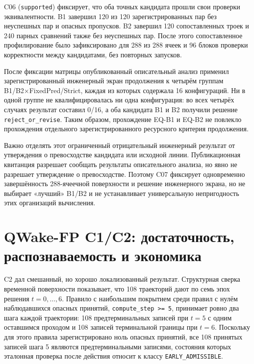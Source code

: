 C06 (\texttt{supported}) фиксирует, что оба точных кандидата прошли свои
проверки эквивалентности. B1 завершил 120 из 120 зарегистрированных пар без неуспешных пар и опасных пропусков. B2
завершил 120 сопоставленных троек и 240 парных сравнений также без неуспешных
пар. После этого сопоставленное профилирование было зафиксировано для 288 из
288 ячеек и 96 блоков проверки корректности между кандидатами, без повторных
запусков.

После фиксации матрицы опубликованный описательный анализ применил
зарегистрированный инженерный экран продолжения к четырём группам
B1/B2×FixedPred/Strict, каждая из которых содержала 16 конфигураций. Ни в одной
группе не квалифицировалась ни одна конфигурация: во всех четырёх случаях
результат составил 0/16, а оба кандидата B1 и B2 получили решение
\texttt{reject\_or\_revise}. Таким образом, прохождение EQ-B1 и EQ-B2 не повлекло
прохождения отдельного зарегистрированного ресурсного критерия продолжения.

Важно отделять этот ограниченный отрицательный инженерный результат от
утверждения о превосходстве кандидата или исходной линии. Публикационная
квитанция разрешает сообщать результаты описательного анализа, но явно не
разрешает утверждение о превосходстве. Поэтому C07 фиксирует одновременно
завершённость 288-ячеечной поверхности и решение инженерного экрана, но не
выбирает «лучший» B1/B2 и не устанавливает универсальную непригодность этих
организаций вычисления.

\section{QWake-FP C1/C2: достаточность, распознаваемость и экономика}
\label{sec:results-qwake}

C2 дал смешанный, но хорошо локализованный результат. Структурная сверка
временной поверхности показывает, что 108 траекторий дают по семь эпох решения
$t=0,\ldots,6$. Правило с наибольшим покрытием среди правил с нулём
наблюдавшихся опасных принятий, \texttt{compute\_step >= 5}, принимает ровно
два шага каждой траектории: 108 предтерминальных записей при $t=5$ с одним
оставшимся проходом и 108 записей терминальной границы при $t=6$. Поскольку для
этого правила зарегистрировано ноль опасных принятий, все 108 принятых записей
шага 5 являются предтерминальными записями, состояния которых эталонная
проверка после действия относит к классу \texttt{EARLY\_ADMISSIBLE}.

